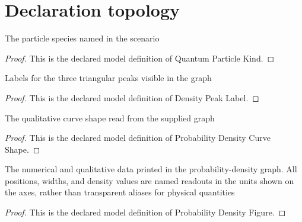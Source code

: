 \section{Declaration topology}
\begin{definition}
  \label{def:physics:phyx-mini-0502:phyxminiproblems-problemphyxmini0502-quantumparticlekind}
  The particle species named in the scenario
\end{definition}
\begin{proof}
  This is the declared model definition of Quantum Particle Kind.
\end{proof}
\begin{definition}
  \label{def:physics:phyx-mini-0502:phyxminiproblems-problemphyxmini0502-densitypeaklabel}
  Labels for the three triangular peaks visible in the graph
\end{definition}
\begin{proof}
  This is the declared model definition of Density Peak Label.
\end{proof}
\begin{definition}
  \label{def:physics:phyx-mini-0502:phyxminiproblems-problemphyxmini0502-probabilitydensitycurveshape}
  The qualitative curve shape read from the supplied graph
\end{definition}
\begin{proof}
  This is the declared model definition of Probability Density Curve Shape.
\end{proof}
\begin{definition}
  \label{def:physics:phyx-mini-0502:phyxminiproblems-problemphyxmini0502-probabilitydensityfigure}
  The numerical and qualitative data printed in the probability-density graph. All positions, widths, and density values are named readouts in the units shown on the axes, rather than transparent aliases for physical quantities
\end{definition}
\begin{proof}
  This is the declared model definition of Probability Density Figure.
\end{proof}

